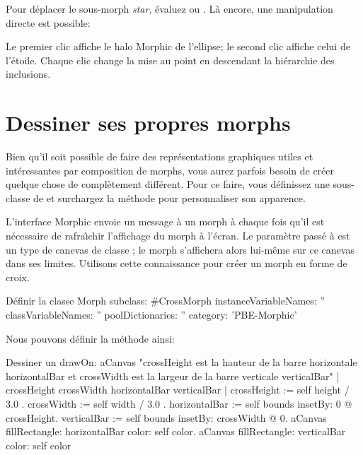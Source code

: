 \documentclass[a4paper,10pt,twoside]{book}
\begin{document}
Pour d\'eplacer le sous-morph \emph{star}, \'evaluez 
  ou 
. L\`a encore, une manipulation directe est
possible: 


\noindent
Le premier clic affiche le halo Morphic de l'ellipse; le second clic
affiche celui de l'\'etoile. Chaque clic change la mise au point en
descendant la hi\'erarchie des inclusions.


\section{Dessiner ses propres morphs}

Bien qu'il soit possible de faire des repr\'esentations graphiques
utiles et int\'eressantes par composition de morphs, vous aurez
parfois besoin de cr\'eer quelque chose de compl\`etement diff\'erent.
Pour ce faire, vous d\'efinissez une sous-classe de  et
surchargez la m\'ethode  pour personnaliser son
apparence.

L'interface Morphic envoie un message  \`a un morph \`a
chaque fois qu'il est n\'ecessaire de rafra\^{\i}chir l'affichage du
morph \`a l'\'ecran. Le param\`etre pass\'e \`a  est un
type de canevas de classe ; le morph s'affichera alors
lui-m\^eme sur ce canevas dans ses limites. %
Utilisons cette connaissance pour cr\'eer un morph en forme de croix.

\begin{classdef}{D\'efinir la classe }
Morph subclass: #CrossMorph
	instanceVariableNames: ''
	classVariableNames: ''
	poolDictionaries: ''
	category: 'PBE-Morphic'
\end{classdef}

Nous pouvons d\'efinir la m\'ethode  ainsi:
\begin{method}[firstDrawOn]{Dessiner un }
drawOn: aCanvas 
	"crossHeight est la hauteur de la barre horizontale horizontalBar
    et crossWidth est la largeur de la barre verticale verticalBar"
    | crossHeight crossWidth horizontalBar verticalBar |
	crossHeight := self height / 3.0 .
	crossWidth := self width / 3.0 .
	horizontalBar := self bounds insetBy: 0 @ crossHeight.
	verticalBar := self bounds insetBy: crossWidth @ 0.
	aCanvas fillRectangle: horizontalBar color: self color.
	aCanvas fillRectangle: verticalBar color: self color
\end{method}
\end{document}
